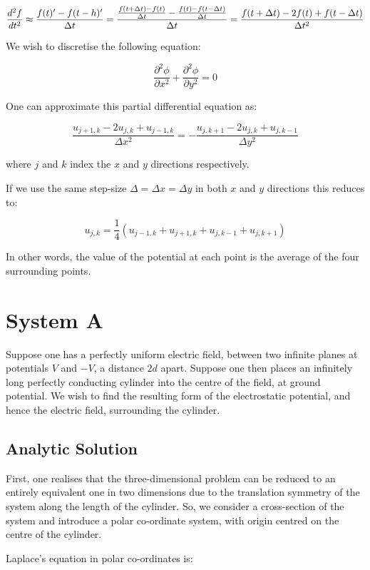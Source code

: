 \documentclass{article}
\newcommand{\be}{\begin{equation}}
\newcommand{\ee}{\end{equation}}
\begin{document}
\be
\frac{d^2 f}{dt^2} \approx \frac{f(t)' - f(t-h)'}{\Delta t} \\
= \frac{\frac{f(t +\Delta t) - f(t)}{\Delta t} - \frac{f(t) - f(t -\Delta t)}{\Delta t}}{\Delta t} \\
= \frac{f(t +\Delta t) - 2f(t) + f(t-\Delta t)}{\Delta t ^2}
\ee

We wish to discretise the following equation:

\be
\frac{\partial^2 \phi}{\partial x^2}+\frac{\partial^2 \phi}{\partial y^2} = 0
\ee

One can approximate this partial differential equation as:

\be
\frac{u_{j+1,k}-2u_{j,k}+u_{j-1,k}}{\Delta x^2} = - \frac{u_{j,k+1}-2u_{j,k}+u_{j,k-1}}{\Delta y^2}
\ee

where $j$ and $k$ index the $x$ and $y$ directions respectively.

If we use the same step-size $\Delta=\Delta x=\Delta y$ in both $x$ and $y$ directions this
reduces to:

\be
u_{j,k}= \frac{1}{4}(u_{j-1,k}+u_{j+1,k}+u_{j,k-1}+u_{j,k+1})
\ee

In other words, the value of the potential at each point is the average of
the four surrounding points.

\section{System A}

Suppose one has a perfectly uniform electric field, between two infinite planes
at potentials $V$ and $-V$, a distance $2d$ apart. Suppose one then places an
infinitely long perfectly conducting cylinder into the centre of the field,
at ground potential. We wish to find the resulting form of the electrostatic
potential, and hence the electric field, surrounding the cylinder.

\subsection{Analytic Solution}
First, one realises that the three-dimensional problem can be reduced to an entirely
equivalent one in two dimensions due to the translation symmetry of the system along
the length of the cylinder. So, we consider a cross-section of the system and introduce
a polar co-ordinate system, with origin centred on the centre of the cylinder.

Laplace's equation in polar co-ordinates is: 
\end{document}
